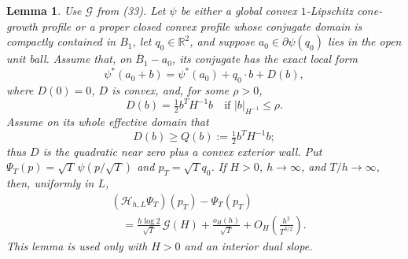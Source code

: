 \documentclass{smfart}
\newtheorem{lemma}[theorem]{Lemma}
\theoremstyle{definition}
\newcommand{\1}{\mathbf 1}
\begin{document}
\begin{lemma}\label{lem:nonlinear-consistency}
Use $\mathcal G$ from (33).  Let $\psi$ be either a global convex
$1$-Lipschitz cone-growth profile or a proper closed convex profile
whose conjugate domain is compactly contained in $B_ 1$,
let $q_ 0\in\mathbb R^2$, and suppose
$a_ 0\in\partial\psi(q_ 0)$ lies in the open unit ball.  Assume that,
on $\overline B_ 1-a_ 0$, its conjugate has the exact local form
\begin{equation}
\psi^*(a_ 0+b)=\psi^*(a_ 0)+q_ 0\cdot b+D(b),
\tag{34}
\end{equation}
where $D(0)=0$, $D$ is convex, and, for some $\rho>0$,
\begin{equation}
D(b)=\tfrac12b^TH^{-1}b\quad\text{if }|b|_ {H^{-1}}\leq\rho.
\tag{34a}
\end{equation}
Assume on its whole effective domain that
\begin{equation*}
D(b)\geq Q(b):=\tfrac12b^TH^{-1}b;
\end{equation*}
thus $D$ is the quadratic near zero plus a convex exterior wall.  Put
$\Psi_ T(p)=\sqrt T\,\psi(p/\sqrt T)$ and
$p_ T=\sqrt Tq_ 0$.  If $H>0$, $h\to\infty$, and
$T/h\to\infty$, then, uniformly in $L$,
\begin{equation}
\begin{split}
&(\mathcal H_ {h,L}\Psi_ T)(p_ T)-\Psi_ T(p_ T)\\
&\quad=\frac{h\log2}{\sqrt T}\,\mathcal G(H)+\frac{o_ H(h)}{\sqrt T}
+O_ H\!\left(\frac{h^2}{T^{3/2}}\right).
\end{split}
\tag{35}
\end{equation}
This lemma is used only with $H>0$ and an interior dual slope.

\end{lemma}
\end{document}
